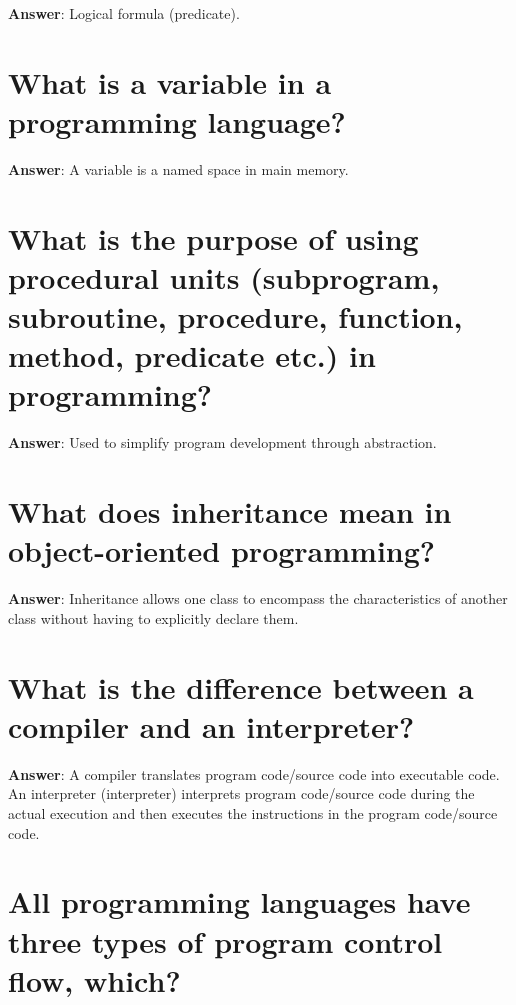 \documentclass[a4paper,11pt,oneside]{book}
\begin{document}
\begin{sloppypar}
\label{q:216:sa:en:True}

\textbf{Answer}: Logical formula (predicate).



\section{What is a variable in a programming language?}

\label{q:217:sa:en:True}

\textbf{Answer}: A variable is a named space in main memory.



\section{What is the purpose of using procedural units (subprogram, subroutine, procedure, function, method, predicate etc.) in programming?}

\label{q:218:sa:en:True}

\textbf{Answer}: Used to simplify program development through abstraction.



\section{What does inheritance mean in object-oriented programming?}

\label{q:219:sa:en:True}

\textbf{Answer}: Inheritance allows one class to encompass the characteristics of another class without having to explicitly declare them.



\section{What is the difference between a compiler and an interpreter?}

\label{q:220:sa:en:True}

\textbf{Answer}: A compiler translates program code/source code into executable code. An interpreter (interpreter) interprets program code/source code during the actual execution and then executes the instructions in the program code/source code.



\section{All programming languages have three types of program control flow, which?}


\end{sloppypar}
\end{document}
